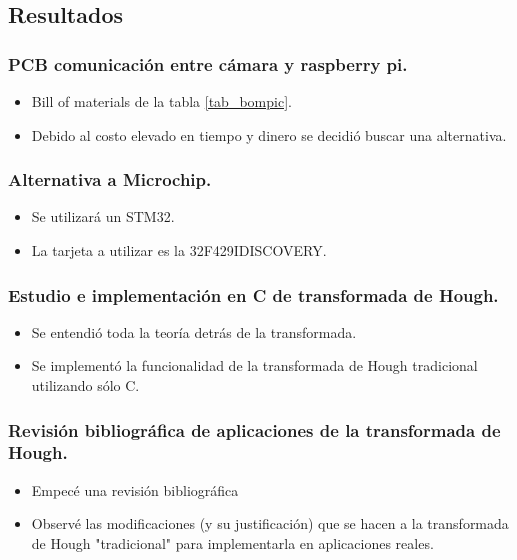 
\subsection{Resultados}

\subsubsection{PCB comunicación entre cámara y raspberry pi.}
\begin{itemize}
	\item Bill of materials de la tabla \ref{tab_bompic}.
	\item Debido al costo elevado en tiempo y dinero se decidió buscar una alternativa.
\end{itemize}

\subsubsection{Alternativa a Microchip.}
\begin{itemize}
	\item Se utilizará un STM32.
	\item La tarjeta a utilizar es la 32F429IDISCOVERY.
\end{itemize}

\subsubsection{Estudio e implementación en C de transformada de Hough.}
\begin{itemize}
	\item Se entendió toda la teoría detrás de la transformada.
	\item Se implementó la funcionalidad de la transformada de Hough tradicional utilizando sólo C.
\end{itemize}

\subsubsection[Revisión bibliográfica transformada de Hough.]{Revisión bibliográfica de aplicaciones de la transformada de Hough.}
\begin{itemize}
	\item Empecé una revisión bibliográfica
	\item Observé las modificaciones (y su justificación) que se hacen a la transformada de Hough "tradicional" para implementarla en aplicaciones reales.
\end{itemize}

